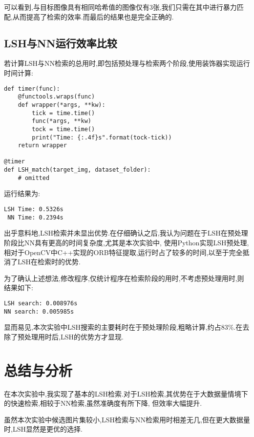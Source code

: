 \documentclass[a4paper]{article}
\begin{document}
可以看到,与目标图像具有相同哈希值的图像仅有3张,我们只需在其中进行暴力匹配,从而提高了检索的效率.而最后的结果也是完全正确的.
    \subsection{LSH与NN运行效率比较}
若计算LSH与NN检索的总用时,即包括预处理与检索两个阶段,使用装饰器实现运行时间计算:
\begin{verbatim}
def timer(func):
    @functools.wraps(func)
    def wrapper(*args, **kw):
        tick = time.time()
        func(*args, **kw)
        tock = time.time()
        print("Time: {:.4f}s".format(tock-tick))
    return wrapper

@timer
def LSH_match(target_img, dataset_folder):
    # omitted
\end{verbatim}

运行结果为:
\begin{verbatim}
LSH Time: 0.5326s
 NN Time: 0.2394s
\end{verbatim}

出乎意料地,LSH检索并未显出优势.在仔细确认之后,我认为问题在于LSH在预处理阶段比NN具有更高的时间复杂度,尤其是本次实验中,
使用Python实现LSH预处理,相对于OpenCV中C++实现的ORB特征提取,运行时占了较多的时间,以至于完全抵消了LSH在检索时的优势.

为了确认上述想法,修改程序,仅统计程序在检索阶段的用时,不考虑预处理用时,则结果如下:
\begin{verbatim}
LSH search: 0.008976s
NN search: 0.005985s
\end{verbatim}

显而易见,本次实验中LSH搜索的主要耗时在于预处理阶段,粗略计算,约占83\%.在去除了预处理用时后,LSH的优势方才显现.
\newpage
\section{总结与分析}
在本次实验中,我实现了基本的LSH检索.对于LSH检索,其优势在于大数据量情境下的快速检索,相较于NN检索,虽然准确度有所下降,
但效率大幅提升.

虽然本次实验中候选图片集较小,LSH检索与NN检索用时相差无几,但在更大数据量时,LSH显然是更优的选择.
\end{document}
